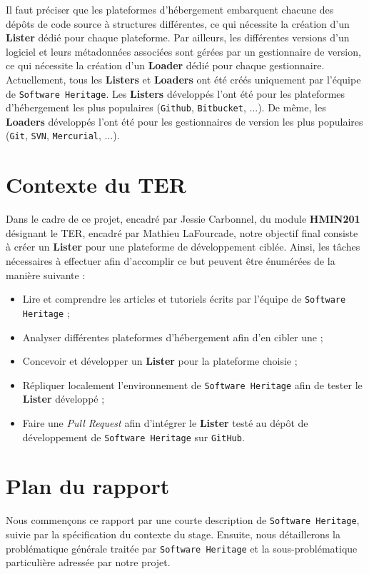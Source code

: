 \documentclass[12pt,a4paper]{report}
\theoremstyle{definition}
\begin{document}
Il faut préciser que les plateformes d’hébergement embarquent chacune des dépôts de code source à structures différentes, ce qui nécessite la création d’un \textbf{Lister} dédié pour chaque plateforme. Par ailleurs, les différentes versions d'un logiciel et leurs métadonnées associées sont gérées par un gestionnaire de version, ce qui nécessite la création d'un \textbf{Loader} dédié pour chaque gestionnaire. Actuellement, tous les \textbf{Listers} et \textbf{Loaders} ont été créés uniquement par l’équipe de \texttt{Software Heritage}. Les \textbf{Listers} développés l'ont été pour les plateformes d’hébergement les plus populaires (\texttt{Github}, \texttt{Bitbucket}, $\dots$). De même, les \textbf{Loaders} développés l'ont été pour les gestionnaires de version les plus populaires (\texttt{Git}, \texttt{SVN}, \texttt{Mercurial}, $\dots$).

\section{Contexte du TER}
Dans le cadre de ce projet, encadré par Jessie Carbonnel, du module \textbf{HMIN201} désignant le TER, encadré par Mathieu LaFourcade, notre objectif final consiste à créer un \textbf{Lister} pour une plateforme de développement ciblée. Ainsi, les tâches nécessaires à effectuer afin d'accomplir ce but peuvent être énumérées de la manière suivante :
\begin{itemize}
	\item Lire et comprendre les articles et tutoriels écrits par l’équipe de \texttt{Software Heritage} ;
	\item Analyser différentes plateformes d’hébergement afin d’en cibler une ;
	\item Concevoir et développer un \textbf{Lister} pour la plateforme choisie ;
	\item Répliquer localement l’environnement de \texttt{Software Heritage} afin de tester le \textbf{Lister} développé ;
	\item Faire une \textit{Pull Request} afin d’intégrer le \textbf{Lister} testé au dépôt de développement de \texttt{Software Heritage} sur \texttt{GitHub}.
\end{itemize}

\section{Plan du rapport}
Nous commençons ce rapport par une courte description de \texttt{Software Heritage}, suivie par la spécification du contexte du stage. Ensuite, nous détaillerons la problématique générale traitée par \texttt{Software Heritage} et la sous-problématique particulière adressée par notre projet.
\end{document}
